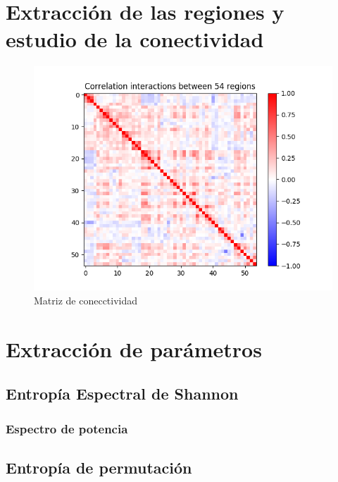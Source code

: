 \section{Extracción de las regiones y estudio de la conectividad}

\begin{figure}[H]
	\includegraphics[width=\linewidth, height=\textheight, keepaspectratio]{img/conectividad/matrix.png}
	\caption{Matriz de conecctividad}
	\label{preproc:conectividad}
\end{figure}
\section{Extracción de parámetros}
\subsection{Entropía Espectral de Shannon}
\subsubsection{Espectro de potencia}
\subsection{Entropía de permutación}

